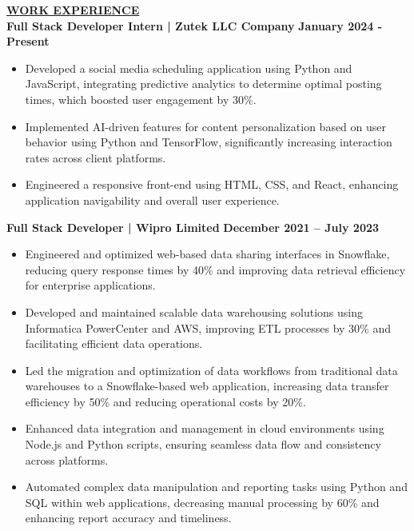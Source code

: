 \documentclass{article}
\begin{document}
\noindent \textbf{\underline{WORK EXPERIENCE}}\\
\noindent \textbf{Full Stack Developer Intern | Zutek LLC Company} \hfill \textbf{January 2024 - Present}
\begin{itemize}[noitemsep,nolistsep,leftmargin=*]
\item {\small Developed a social media scheduling application using Python and JavaScript, integrating predictive analytics to determine optimal posting times, which boosted user engagement by 30\%.}
\item {\small Implemented AI-driven features for content personalization based on user behavior using Python and TensorFlow, significantly increasing interaction rates across client platforms.}
\item {\small Engineered a responsive front-end using HTML, CSS, and React, enhancing application navigability and overall user experience.}
\end{itemize}
\vspace{1mm} 
\noindent \textbf{Full Stack Developer | Wipro Limited} \hfill \textbf{December 2021 – July 2023}
\begin{itemize}[noitemsep,nolistsep,leftmargin=*]
\item {\small Engineered and optimized web-based data sharing interfaces in Snowflake, reducing query response times by 40\% and improving data retrieval efficiency for enterprise applications.}
\item {\small Developed and maintained scalable data warehousing solutions using Informatica PowerCenter and AWS, improving ETL processes by 30\% and facilitating efficient data operations.}
\item {\small Led the migration and optimization of data workflows from traditional data warehouses to a Snowflake-based web application, increasing data transfer efficiency by 50\% and reducing operational costs by 20\%.}
\item {\small Enhanced data integration and management in cloud environments using Node.js and Python scripts, ensuring seamless data flow and consistency across platforms.}
\item {\small Automated complex data manipulation and reporting tasks using Python and SQL within web applications, decreasing manual processing by 60\% and enhancing report accuracy and timeliness.}
\end{itemize}

%
%
\end{document}
